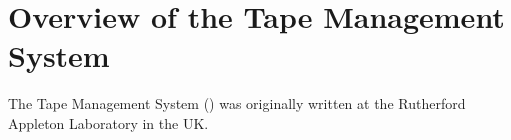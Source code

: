 \chapter{Overview of the Tape Management System}

The Tape Management System (\TMS{}) was originally written
at the Rutherford Appleton Laboratory in the UK.
